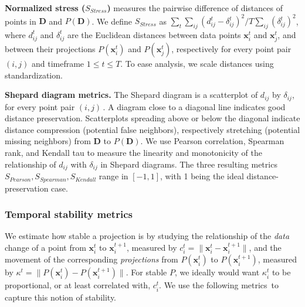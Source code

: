 
\noindent\textbf{Normalized stress ($S_{Stress}$)} measures the pairwise difference of distances of points in $\mathbf{D}$ and $P(\mathbf{D})$. We define $S_{Stress}$ as $\sum_t \sum_{ij}(d_{ij}^t - {\delta_{ij}^t})^{2} / T\sum_{ij} (\delta_{ij}^t)^{2}$, where $d_{ij}^t$ and ${\delta_{ij}^t}$ are the Euclidean distances between data points $\mathbf{x}_i^t$ and $\mathbf{x}_j^t$, and between their projections $P(\mathbf{x}_i^t)$ and $P(\mathbf{x}_j^t)$, respectively for every point pair $(i,j)$ and timeframe $1 \leq t \leq T$. To ease analysis, we scale distances using standardization.

\noindent\textbf{Shepard diagram metrics.} The Shepard diagram is a scatterplot of $d_{ij}$ by $\delta_{ij}$, for every point pair $(i,j)$\,\cite{Joia2011}. A diagram close to a diagonal line indicates good distance preservation.
Scatterplots spreading above or below the diagonal indicate distance compression (potential false neighbors), respectively stretching (potential missing neighbors) from $\mathbf{D}$ to $P(\mathbf{D})$. We use Pearson correlation, Spearman rank, and Kendall tau to measure the linearity and monotonicity of the relationship of $d_{ij}$ with $\delta_{ij}$ in Shepard diagrams. The three resulting metrics $S_{Pearson}, S_{Spearman}, S_{Kendall}$ range in $[-1,1]$, with 1 being the ideal distance-preservation case.


\subsubsection{Temporal stability metrics}
%
We estimate how stable a projection is by studying the relationship of the \emph{data} change of a point from $\mathbf{x}_i^t$ to $\mathbf{x}_i^{t+1}$, measured by $ c_i^t = \|\mathbf{x}_i^t - \mathbf{x}_i^{t+1}\|$, 
and the movement of the corresponding \emph{projections} from $P(\mathbf{x}_i^t)$ to $P(\mathbf{x}_i^{t+1})$, measured by $ \kappa^t = \|P(\mathbf{x}_i^t) - P(\mathbf{x}_i^{t+1})\|$. 
For stable $P$, we ideally would want $\kappa_i^t$ to be proportional, or at least correlated with, $c_i^t$. We use the following metrics\,\cite{Vernier2020} to capture this notion of stability.


